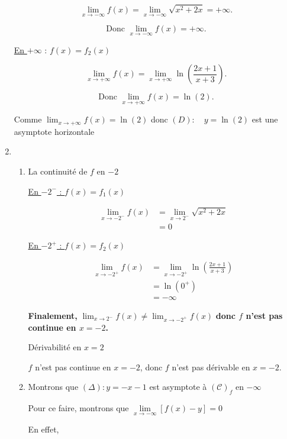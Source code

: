 \documentclass[12pt,a4paper]{article}
\begin{document}
\begin{enumerate}
\[
\lim_{x \to -\infty} f(x) = \lim_{x \to -\infty} \sqrt{x^2 + 2x} = +\infty.
\]

\[
\text{Donc } \lim_{x \to -\infty} f(x) = +\infty.
\]

\underline{En $+\infty$} : $f(x) = f_2(x)$

\[
\lim_{x \to +\infty} f(x) = \lim_{x \to +\infty} \ln\left(\frac{2x + 1}{x + 3}\right).
\]

\[
\text{Donc } \lim_{x \to +\infty} f(x) = \ln(2).
\]

Comme $\lim_{x \to +\infty} f(x) = \ln(2)$ donc $(D): \quad y=\ln(2)$ est une asymptote horizontale
\item 
\begin{enumerate}
    \item La continuité de $f$ en $-2$
    
   \underline{ En $-2^{-}$ : $f(x) = f_1(x)$ }
   
\begin{align*}
    \lim_{x \to -2^-} f(x) &= \lim_{x \to 2^-} \sqrt{x^2 + 2x}\\
                          &= 0
\end{align*}

\underline{ En $-2^{+}$ : $f(x) = f_2(x)$ }

\begin{align*}
    \lim_{x \to -2^+} f(x) &= \lim_{x \to -2^+} \ln\left(\frac{2x + 1}{x + 3}\right)\\
                          &= \ln(0^+)\\
                          &= -\infty
\end{align*}

\textbf{Finalement,} $ \lim_{x \to 2^-} f(x) \neq \lim_{x \to -2^+} f(x) $ \textbf{donc $f$ n'est pas continue en $x = -2$.}

    Dérivabilité en \( x = 2 \)

\( f \) n'est pas continue en \( x = -2 \), donc \( f \) n'est pas dérivable en \( x = -2 \).


\item Montrons que \( ( \Delta ) : y = -x - 1 \) est asymptote à \( ( \mathcal{C} )_{f}\) en \( -\infty \)

Pour ce faire, montrons que \( \lim\limits_{x \to -\infty} \left[ f(x) - y \right] = 0\)

En effet,


\end{enumerate}
\end{enumerate}
\end{document}
